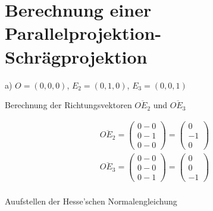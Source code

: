 
\setcounter{P-section}{12}
\renewcommand*\thesection{P\Nummerierung{\arabic{P-section}}}
\section{Berechnung einer Parallelprojektion- Schrägprojektion}

a) \ensuremath{O=(0,0,0)}, \ensuremath{E_2=(0,1,0)}, \ensuremath{E_3 = (0,0,1)}

Berechnung der Richtungsvektoren \ensuremath{\overline{OE_2}} und \ensuremath{\overline{OE_3}}

\begin{gather}
	\overline{OE_2} = 
	\begin{pmatrix}
	0-0\\
	0-1\\
	0-0
	\end{pmatrix}
	= \begin{pmatrix}
	0\\-1\\0
	\end{pmatrix}\\
		\overline{OE_3} = 
	\begin{pmatrix}
	0-0\\
	0-0\\
	0-1
	\end{pmatrix}
	= \begin{pmatrix}
	0\\0\\-1
	\end{pmatrix}
	\end{gather}\\
	
Auufstellen der Hesse'schen Normalengleichung\\
	
